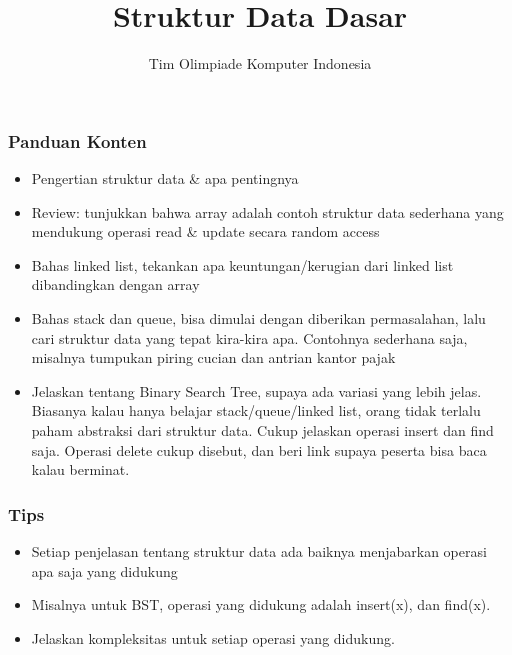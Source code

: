 

\title{Struktur Data Dasar}
\author{Tim Olimpiade Komputer Indonesia}
\date{}



\begin{frame}
\titlepage
\end{frame}

\begin{frame}
\frametitle{Panduan Konten}
\begin{itemize}
  \item Pengertian struktur data \& apa pentingnya
  \item Review: tunjukkan bahwa array adalah contoh struktur data sederhana yang mendukung operasi read \& update secara random access
  \item Bahas linked list, tekankan apa keuntungan/kerugian dari linked list dibandingkan dengan array
  \item Bahas stack dan queue, bisa dimulai dengan diberikan permasalahan, lalu cari struktur data yang tepat kira-kira apa. Contohnya sederhana saja, misalnya tumpukan piring cucian dan antrian kantor pajak
  \item Jelaskan tentang Binary Search Tree, supaya ada variasi yang lebih jelas. Biasanya kalau hanya belajar stack/queue/linked list, orang tidak terlalu paham abstraksi dari struktur data. Cukup jelaskan operasi insert dan find saja. Operasi delete cukup disebut, dan beri link supaya peserta bisa baca kalau berminat.
\end{itemize}
\end{frame}

\begin{frame}
\frametitle{Tips}
\begin{itemize}
  \item Setiap penjelasan tentang struktur data ada baiknya menjabarkan operasi apa saja yang didukung
  \item Misalnya untuk BST, operasi yang didukung adalah insert(x), dan find(x).
  \item Jelaskan kompleksitas untuk setiap operasi yang didukung.
\end{itemize}
\end{frame}

